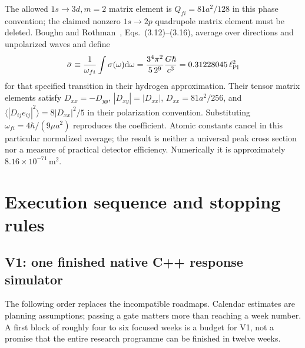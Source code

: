\documentclass[a4paper,11pt]{article}
\newcommand{\dd}{\mathrm{d}}
\begin{document}
The allowed $1s\to3d,m=2$ matrix element is $Q_{fi}=81a^2/128$ in this phase convention; the claimed nonzero $1s\to2p$ quadrupole matrix element must be deleted. Boughn and Rothman~\cite{boughn}, Eqs.~(3.12)--(3.16), average over directions and unpolarized waves and define
\begin{equation}
 \bar\sigma\equiv\frac1{\omega_{fi}}\int\sigma(\omega)\dd\omega
 =\frac{3^4\pi^2}{5\,2^9}\frac{G\hbar}{c^3}
 =0.31228045\,\ell_{\rm Pl}^2
\end{equation}
for that specified transition in their hydrogen approximation. Their tensor matrix elements satisfy $D_{xx}=-D_{yy}$, $|D_{xy}|=|D_{xx}|$, $D_{xx}=81a^2/256$, and
$\langle|D_{ij}e_{ij}|^2\rangle=8|D_{xx}|^2/5$ in their polarization convention. Substituting $\omega_{fi}=4\hbar/(9\mu a^2)$ reproduces the coefficient. Atomic constants cancel in this particular normalized average; the result is neither a universal peak cross section nor a measure of practical detector efficiency. Numerically it is approximately $8.16\times10^{-71}\,\mathrm m^2$.

\section{Execution sequence and stopping rules}
\label{sec:roadmap}

\subsection{V1: one finished native C++ response simulator}

The following order replaces the incompatible roadmaps. Calendar estimates are planning assumptions; passing a gate matters more than reaching a week number. A first block of roughly four to six focused weeks is a budget for V1, not a promise that the entire research programme can be finished in twelve weeks.
\end{document}
